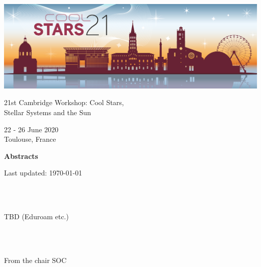 \documentclass[a4paper,11pt]{book}
\begin{document}
\frontmatter

\thispagestyle{empty}
\begin{titlepage}
  \centering
  \includegraphics[width=.99\textwidth]{images/CS21baniere.jpg}
  \par{\Huge 21st Cambridge Workshop: Cool Stars,\\ Stellar Systems and the Sun \par}
  \par{\LARGE 22 - 26 June 2020\\  Toulouse, France \par}
  \par{\Huge\bfseries Abstracts\par}
  \vspace{5cm}
  \newpage
  \thispagestyle{empty}
  \vspace*{\fill}
  {\large Last updated: \today\par}
\end{titlepage}

\thispagestyle{empty}
\tableofcontents

\newpage
{}

\par{}
\\
\\
\par\noindent TBD (Eduroam etc.)
\newpage
{}

\par{}
\\
\\
\par\noindent From the chair SOC
\newpage
{}
\end{document}
